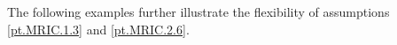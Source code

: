 \documentclass[ejsv2]{imsart}
\theoremstyle{plain}
\theoremstyle{definition}
\theoremstyle{remark}
\begin{document}

The following examples further illustrate the flexibility of assumptions \eqref{pt.MRIC.1.3} and \eqref{pt.MRIC.2.6}.

\end{document}
